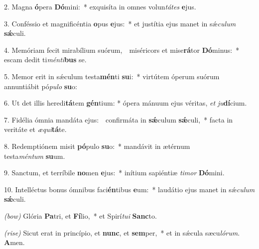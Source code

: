 2. Magna \textbf{ó}pera \textbf{Dó}mini:~*
	exquisíta in omnes volun\textit{tá}\textit{tes} \textbf{e}jus.

3. Conféssio et magnificéntia \textbf{o}pus \textbf{e}jus:~*
	et justítia ejus manet in s\'{\ae}\textit{cu}\textit{lum} \textbf{s\'{\ae}}culi.

4. Memóriam fecit mirabílium suórum,~{\color{red}\GreDagger}\
	miséricors et mise\textbf{rá}tor \textbf{Dó}minus:~*
	escam dedit ti\textit{mén}\textit{ti}\textbf{bus} se.

5. Memor erit in s\'{\ae}culum testa\textbf{mén}ti \textbf{su}i:~*
	virtútem óperum suórum annuntiábit pó\textit{pu}\textit{lo} \textbf{su}o:

6. Ut det illis heredi\textbf{tá}tem \textbf{gén}tium: *
	ópera mánuum ejus véritas, \textit{et} \textit{ju}\textbf{dí}\-cium.

7. Fidélia ómnia mandáta ejus:~{\color{red}\GreDagger}\
	confirmáta in \textbf{s\'{\ae}}culum \textbf{s\'{\ae}}culi,~*
	facta in veritáte et \textit{æ}\textit{qui}\textbf{tá}te.

8. Redemptiónem misit \textbf{pó}pulo \textbf{su}o:~*
	mandávit in ætérnum\\ testa\textit{mén}\textit{tum} \textbf{su}um.

9. Sanctum, et terríbile \textbf{no}men \textbf{e}jus:~*
	inítium sapiéntiæ \textit{ti}\textit{mor} \textbf{Dó}\-mini.

10. Intelléctus bonus ómnibus faci\textbf{én}tibus \textbf{e}um:~*
	laudátio ejus manet in s\'{\ae}\textit{cu}\textit{lum} \textbf{s\'{\ae}}culi.

\textit{(bow)} Glória \textbf{Pa}tri, et \textbf{Fí}lio,~*
	et Spirí\textit{tu}\textit{i} \textbf{Sanc}to.

\textit{(rise)} Sicut erat in princípio, et \textbf{nunc}, et \textbf{sem}per,~*
	et in s\'{\ae}cula sæcu\textit{ló}\textit{rum}. \textbf{A}men.
